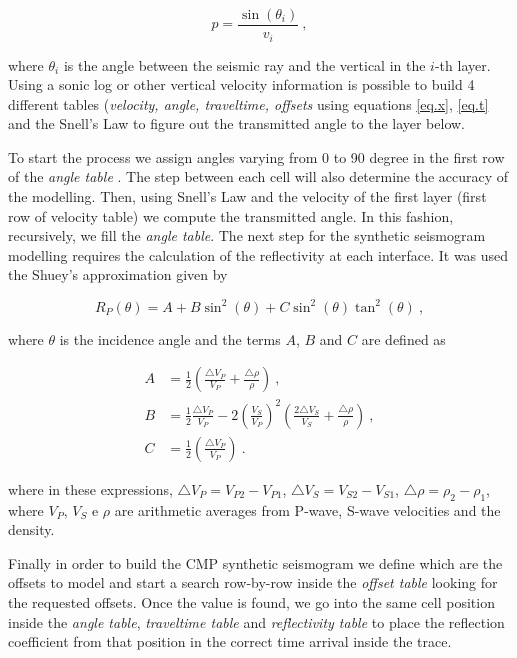 \documentclass{vie16}
\begin{document}
\begin{equation}
p = \frac{\sin(\theta_{i})}{v_{i}}\ ,\label{eq.p}
\end{equation}

where $\theta_i$ is the angle between the seismic ray and the vertical in the $i$-th layer. Using a sonic log or other vertical velocity information is possible to build 4 different tables (\textit{velocity, angle, traveltime, offsets} using equations \ref{eq.x}, \ref{eq.t} and the Snell's Law to figure out the transmitted angle to the layer below. 

To start the process we assign angles varying from 0 to 90 degree in the first row of the \textit{angle table} . The step between each cell will also determine the accuracy of the modelling. Then, using Snell's Law and the velocity of the first layer (first row of velocity table) we compute the transmitted angle. In this fashion, recursively, we fill the \textit{angle table}. The next step for the synthetic seismogram modelling requires the calculation of the reflectivity at each interface. It was used the Shuey's approximation \cite{Shuey1985} given by

\begin{equation}
R_{P} (\theta) = A + B\sin^{2}(\theta) + C\sin^{2}(\theta)\tan^{2}(\theta)
\ , \label{eq.shuey}
\end{equation}

where $\theta$ is the incidence angle and the terms $A$, $B$ and $C$ are defined as

\begin{equation}
\begin{split}
A & = \frac{1}{2} \left(\frac{\triangle V_{P}}{V_{P}}     +
\frac{\triangle \rho}{\rho}     \right)\ , \\
B & = \frac{1}{2} \frac{\triangle V_{P}}{V_{P}}  - 2\left(\frac{
V_{S}}{V_{P}}\right)^{2}  \left(\frac{2\triangle V_{S}}{V_{S}} +
\frac{\triangle \rho}{\rho}\right)   \ , \\
C & = \frac{1}{2} \left(\frac{\triangle V_{P}}{V_{P}} \right) \ .
\end{split}
\end{equation}

where in these expressions, $\triangle V_{P} = V_{P2} - V_{P1}$, $\triangle V_{S} = V_{S2} - V_{S1}$, $\triangle \rho = \rho_{2} - \rho_{1}$, where $V_{P}$, $V_{S}$ e $\rho$ are arithmetic averages from P-wave, S-wave velocities and the density.

Finally in order to build the CMP synthetic seismogram we define which are the offsets to model and start a search row-by-row inside the \textit{offset table} looking for the requested offsets. Once the value is found, we go into the same cell position inside the \textit{angle table}, \textit{traveltime table} and \textit{reflectivity table} to place the reflection coefficient from that position in the correct time arrival inside the trace.
\end{document}

